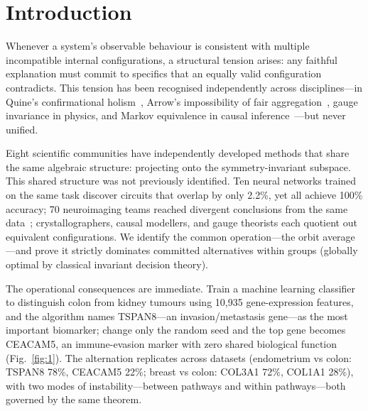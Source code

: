 \documentclass[11pt]{article}
\begin{document}
\section*{Introduction}

Whenever a system's observable behaviour is consistent with multiple
incompatible internal configurations, a structural tension arises: any
faithful explanation must commit to specifics that an equally valid
configuration contradicts.  This tension has been recognised independently
across disciplines---in Quine's confirmational
holism~\citep{quine1951dogmas}, Arrow's impossibility of fair
aggregation~\citep{arrow1951social}, gauge invariance in physics, and
Markov equivalence in causal
inference~\citep{verma1991equivalence}---but never unified.

Eight scientific communities have independently developed methods
that share the same algebraic structure: projecting onto the
symmetry-invariant subspace.  This shared structure was not previously
identified.  Ten neural networks trained on the same task discover
circuits that overlap by only 2.2\%, yet all achieve 100\% accuracy;
70 neuroimaging teams reached divergent conclusions from the same
data~\citep{botviniknezer2020variability}; crystallographers, causal
modellers, and gauge theorists each quotient out equivalent
configurations.  We identify the common operation---the orbit
average---and prove it strictly dominates committed alternatives within groups (globally optimal by classical invariant decision theory).

The operational consequences are immediate.  Train a machine learning
classifier to distinguish colon from kidney tumours using 10{,}935
gene-expression features, and the algorithm names TSPAN8---an
invasion/metastasis gene---as the most important biomarker; change only
the random seed and the top gene becomes CEACAM5, an immune-evasion
marker with zero shared biological function
(Fig.~\ref{fig:1}).  The alternation replicates across datasets (endometrium
vs colon: TSPAN8 78\%, CEACAM5 22\%; breast vs colon: COL3A1 72\%,
COL1A1 28\%), with two modes of instability---between pathways and within
pathways---both governed by the same theorem.
\end{document}
